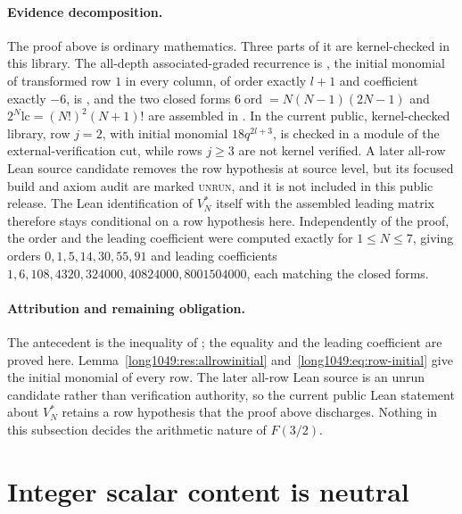 \documentclass[11pt]{article}
\begin{document}
\paragraph{Evidence decomposition.}
The proof above is ordinary mathematics.  Three parts of it are kernel-checked
in this library.  The all-depth
associated-graded recurrence is
,
the initial monomial of transformed row $1$ in every column, of order exactly
$l+1$ and coefficient exactly $-6$, is
,
and the two closed forms $6\operatorname{ord}=N(N-1)(2N-1)$ and
$2^{N}\mathrm{lc}=(N!)^{2}(N+1)!$ are assembled in
.  In the current public, kernel-checked library, row $j=2$,
with initial monomial $18q^{2l+3}$, is checked in a module of the
external-verification cut, while rows $j\ge3$ are not kernel verified.  A later
all-row Lean source candidate removes the row hypothesis at source level, but
its focused build and axiom audit are marked \textsc{unrun}, and it is not
included in this public release.  The Lean identification of $V_N^{*}$ itself
with the assembled leading matrix therefore stays conditional on a row
hypothesis here.  Independently of the proof, the order and the
leading coefficient were computed exactly for $1\le N\le7$, giving orders
$0,1,5,14,30,55,91$ and leading coefficients
$1,6,108,4320,324000,40824000,8001504000$, each matching the closed forms.

\paragraph{Attribution and remaining obligation.}
The antecedent is the inequality of \cite[Sec.~4]{zudilin2016}; the equality and
the leading coefficient are proved here.  Lemma~\ref{long1049:res:allrowinitial}
and~\eqref{long1049:eq:row-initial} give the initial monomial of every row.  The
later all-row Lean source is an unrun candidate rather than verification
authority, so the current public Lean statement about $V_N^{*}$ retains a row
hypothesis that the proof above discharges.  Nothing in this subsection decides
the arithmetic nature of $F(3/2)$.

\section{Integer scalar content is neutral}\label{long1049:sec:primitive}
\end{document}
